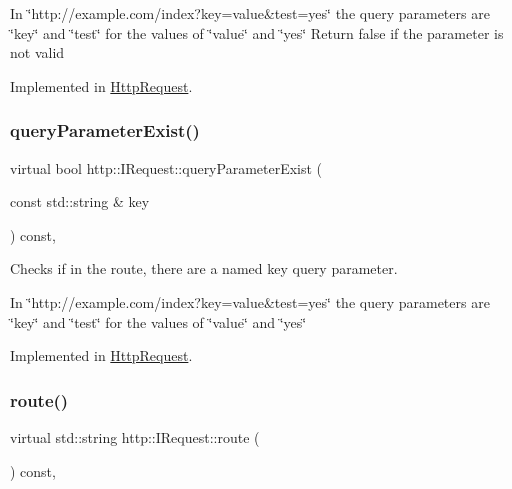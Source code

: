 In \char`\"{}http\+://example.\+com/index?key=value\&test=yes\char`\"{} the query parameters are \char`\"{}key\char`\"{} and \char`\"{}test\char`\"{} for the values of \char`\"{}value\char`\"{} and \char`\"{}yes\char`\"{} Return false if the parameter is not valid 

Implemented in \hyperlink{classHttpRequest_a09bf36e9a2c76927ee45e6c5c699c461}{Http\+Request}.

\mbox{\label{structhttp_1_1IRequest_a3f2a5c8775396ac91971881d88d59c62}} 
\subsubsection{\texorpdfstring{query\+Parameter\+Exist()}{queryParameterExist()}}
{\footnotesize\ttfamily virtual bool http\+::\+I\+Request\+::query\+Parameter\+Exist (\begin{DoxyParamCaption}\item[{const std\+::string \&}]{key }\end{DoxyParamCaption}) const\hspace{0.3cm}{\ttfamily [pure virtual]}, {\ttfamily [noexcept]}}



Checks if in the route, there are a named \textquotesingle{}key\textquotesingle{} query parameter. 

In \char`\"{}http\+://example.\+com/index?key=value\&test=yes\char`\"{} the query parameters are \char`\"{}key\char`\"{} and \char`\"{}test\char`\"{} for the values of \char`\"{}value\char`\"{} and \char`\"{}yes\char`\"{} 

Implemented in \hyperlink{classHttpRequest_a81ce6a379efeba53bd3d40699462628b}{Http\+Request}.

\mbox{\label{structhttp_1_1IRequest_aa7827e21a7d25038ebc1124ae08f02de}} 
\subsubsection{\texorpdfstring{route()}{route()}\hspace{0.1cm}{\footnotesize\ttfamily [1/2]}}
{\footnotesize\ttfamily virtual std\+::string http\+::\+I\+Request\+::route (\begin{DoxyParamCaption}{ }\end{DoxyParamCaption}) const\hspace{0.3cm}{\ttfamily [pure virtual]}, {\ttfamily [noexcept]}}



